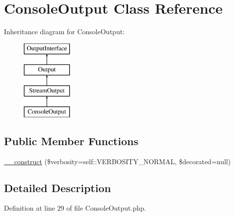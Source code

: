 \hypertarget{class_symfony_1_1_components_1_1_console_1_1_output_1_1_console_output}{
\section{ConsoleOutput Class Reference}
\label{class_symfony_1_1_components_1_1_console_1_1_output_1_1_console_output}
}
Inheritance diagram for ConsoleOutput:\begin{figure}[H]
\begin{center}
\leavevmode
\includegraphics[height=4.000000cm]{class_symfony_1_1_components_1_1_console_1_1_output_1_1_console_output}
\end{center}
\end{figure}
\subsection*{Public Member Functions}
\begin{DoxyCompactItemize}
\item 
\hyperlink{class_symfony_1_1_components_1_1_console_1_1_output_1_1_console_output_aabcb955eb7af02fe6a158b5f0e6fbac5}{\_\-\_\-construct} (\$verbosity=self::VERBOSITY\_\-NORMAL, \$decorated=null)
\end{DoxyCompactItemize}


\subsection{Detailed Description}


Definition at line 29 of file ConsoleOutput.php.



